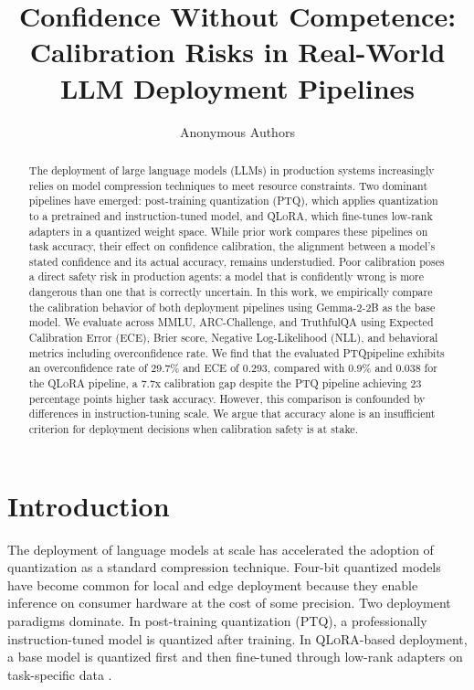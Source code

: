 \documentclass[10pt]{article}
\title{Confidence Without Competence: Calibration Risks in Real-World LLM Deployment Pipelines}
\author{\name Anonymous Authors}
\newcommand{\ptq}{\textsc{PTQ}}
\newcommand{\qlora}{\textsc{QLoRA}}
\newcommand{\ece}{\textsc{ECE}}
\newcommand{\nll}{\textsc{NLL}}
\begin{document}
\maketitle

\begin{abstract}
The deployment of large language models (LLMs) in production systems increasingly relies on model compression techniques to meet resource constraints. Two dominant pipelines have emerged: post-training quantization (\ptq), which applies quantization to a pretrained and instruction-tuned model, and \qlora, which fine-tunes low-rank adapters in a quantized weight space. While prior work compares these pipelines on task accuracy, their effect on confidence calibration, the alignment between a model's stated confidence and its actual accuracy, remains understudied. Poor calibration poses a direct safety risk in production agents: a model that is confidently wrong is more dangerous than one that is correctly uncertain. In this work, we empirically compare the calibration behavior of both deployment pipelines using Gemma-2-2B as the base model. We evaluate across MMLU, ARC-Challenge, and TruthfulQA using Expected Calibration Error (\ece), Brier score, Negative Log-Likelihood (\nll), and behavioral metrics including overconfidence rate. We find that the evaluated \ptq pipeline exhibits an overconfidence rate of 29.7\% and \ece{} of 0.293, compared with 0.9\% and 0.038 for the \qlora{} pipeline, a 7.7x calibration gap despite the \ptq{} pipeline achieving 23 percentage points higher task accuracy. However, this comparison is confounded by differences in instruction-tuning scale. We argue that accuracy alone is an insufficient criterion for deployment decisions when calibration safety is at stake.
\end{abstract}

\section{Introduction}

The deployment of language models at scale has accelerated the adoption of quantization as a standard compression technique. Four-bit quantized models have become common for local and edge deployment because they enable inference on consumer hardware at the cost of some precision. Two deployment paradigms dominate. In post-training quantization (\ptq), a professionally instruction-tuned model is quantized after training. In \qlora-based deployment, a base model is quantized first and then fine-tuned through low-rank adapters on task-specific data \citep{dettmers2023qlora,hu2022lora}.
\end{document}
